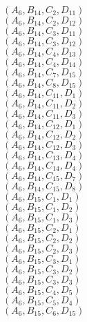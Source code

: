 \documentclass[14pt]{article}
\begin{document}
    $({A}_{6}, {B}_{14}, {C}_{2}, {D}_{11}) $ \\ 
    $({A}_{6}, {B}_{14}, {C}_{2}, {D}_{12}) $ \\ 
    $({A}_{6}, {B}_{14}, {C}_{3}, {D}_{11}) $ \\ 
    $({A}_{6}, {B}_{14}, {C}_{3}, {D}_{12}) $ \\ 
    $({A}_{6}, {B}_{14}, {C}_{4}, {D}_{13}) $ \\ 
    $({A}_{6}, {B}_{14}, {C}_{4}, {D}_{14}) $ \\ 
    $({A}_{6}, {B}_{14}, {C}_{7}, {D}_{15}) $ \\ 
    $({A}_{6}, {B}_{14}, {C}_{8}, {D}_{15}) $ \\ 
    $({A}_{6}, {B}_{14}, {C}_{11}, {D}_{1}) $ \\ 
    $({A}_{6}, {B}_{14}, {C}_{11}, {D}_{2}) $ \\ 
    $({A}_{6}, {B}_{14}, {C}_{11}, {D}_{3}) $ \\ 
    $({A}_{6}, {B}_{14}, {C}_{12}, {D}_{1}) $ \\ 
    $({A}_{6}, {B}_{14}, {C}_{12}, {D}_{2}) $ \\ 
    $({A}_{6}, {B}_{14}, {C}_{12}, {D}_{3}) $ \\ 
    $({A}_{6}, {B}_{14}, {C}_{13}, {D}_{4}) $ \\ 
    $({A}_{6}, {B}_{14}, {C}_{14}, {D}_{4}) $ \\ 
    $({A}_{6}, {B}_{14}, {C}_{15}, {D}_{7}) $ \\ 
    $({A}_{6}, {B}_{14}, {C}_{15}, {D}_{8}) $ \\ 
    $({A}_{6}, {B}_{15}, {C}_{1}, {D}_{1}) $ \\ 
    $({A}_{6}, {B}_{15}, {C}_{1}, {D}_{2}) $ \\ 
    $({A}_{6}, {B}_{15}, {C}_{1}, {D}_{3}) $ \\ 
    $({A}_{6}, {B}_{15}, {C}_{2}, {D}_{1}) $ \\ 
    $({A}_{6}, {B}_{15}, {C}_{2}, {D}_{2}) $ \\ 
    $({A}_{6}, {B}_{15}, {C}_{2}, {D}_{3}) $ \\ 
    $({A}_{6}, {B}_{15}, {C}_{3}, {D}_{1}) $ \\ 
    $({A}_{6}, {B}_{15}, {C}_{3}, {D}_{2}) $ \\ 
    $({A}_{6}, {B}_{15}, {C}_{3}, {D}_{3}) $ \\ 
    $({A}_{6}, {B}_{15}, {C}_{4}, {D}_{5}) $ \\ 
    $({A}_{6}, {B}_{15}, {C}_{5}, {D}_{4}) $ \\ 
    $({A}_{6}, {B}_{15}, {C}_{6}, {D}_{15}) $ \\ 
\end{document}
